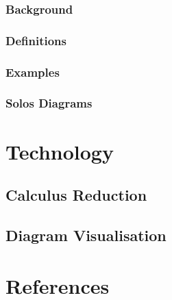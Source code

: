 \documentclass{article}
\begin{document}
        \subsubsection{Background}
            \cite{solo-calculus}
            \cite{acyclic-solos}

        \subsubsection{Definitions}

        \subsubsection{Examples}

        \subsubsection{Solos Diagrams}
            \cite{solo-diagrams}



\section{Technology}

    \subsection{Calculus Reduction}


    \subsection{Diagram Visualisation}
        \cite{learning-styles}



\section{References}

    



\end{document}
